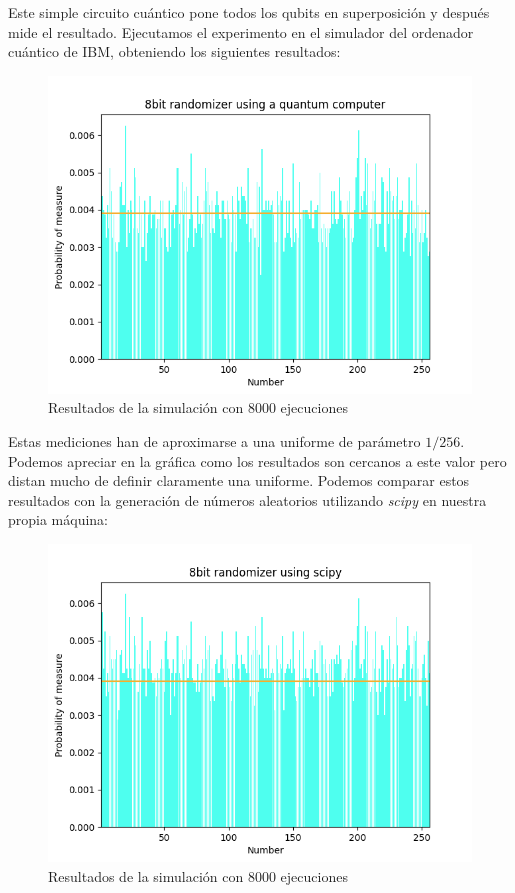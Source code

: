 \documentclass[11pt]{article}
\theoremstyle{plain}
\begin{document}
Este simple circuito cuántico pone todos los qubits en superposición y después mide el resultado. Ejecutamos el experimento en el simulador del ordenador cuántico de IBM, obteniendo los siguientes resultados:

\begin{figure}[H]
	\centering
	\includegraphics[scale=0.7]{figures/barplot_quantum.png}
	\caption{Resultados de la simulación con 8000 ejecuciones}
\end{figure}

Estas mediciones han de aproximarse a una uniforme de parámetro $1/256$. Podemos apreciar en la gráfica como los resultados son cercanos a este valor pero distan mucho de definir claramente una uniforme. Podemos comparar estos resultados con la generación de números aleatorios utilizando \emph{scipy} en nuestra propia máquina:

\begin{figure}[H]
	\centering
	\includegraphics[scale=0.7]{figures/barplot_scipy.png}
	\caption{Resultados de la simulación con 8000 ejecuciones}
\end{figure}
\end{document}
